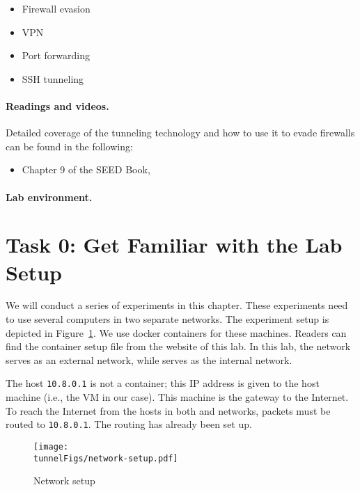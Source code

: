 \begin{itemize}[noitemsep]
\item Firewall evasion
\item VPN
\item Port forwarding
\item SSH tunneling 
\end{itemize}



\paragraph{Readings and videos.}
Detailed coverage of the tunneling technology and how to 
use it to evade firewalls can be found in the following:

\begin{itemize}
\item Chapter 9 of the SEED Book, \seedisbook
\end{itemize}



\paragraph{Lab environment.} 
\seedenvironmentB
\nodependency



\section{Task 0: Get Familiar with the Lab Setup}

We will conduct a series of experiments in this chapter.
These experiments need to use several computers in two
separate networks. The experiment setup is depicted
in Figure~\ref{tunnel:fig:network-setup}. 
We use docker containers for these machines. 
Readers can find the container setup file from the website of this lab.
In this lab, the network \externalnet serves as an external network, 
while \internalnet serves as the internal network. 

The host \texttt{10.8.0.1} is not a container; this IP address
is given to the host machine (i.e., the VM in our case). 
This machine is the gateway to the Internet. To reach the Internet
from the hosts in both \internalnet and \externalnet 
networks, packets must be routed to \texttt{10.8.0.1}. 
The routing has already been set up. 


\begin{figure}[htb]
  \begin{center}
    \texttt{[image: \\tunnelFigs/network-setup.pdf]}
  \end{center}
  \caption{Network setup}
  \label{tunnel:fig:network-setup}
\end{figure}


